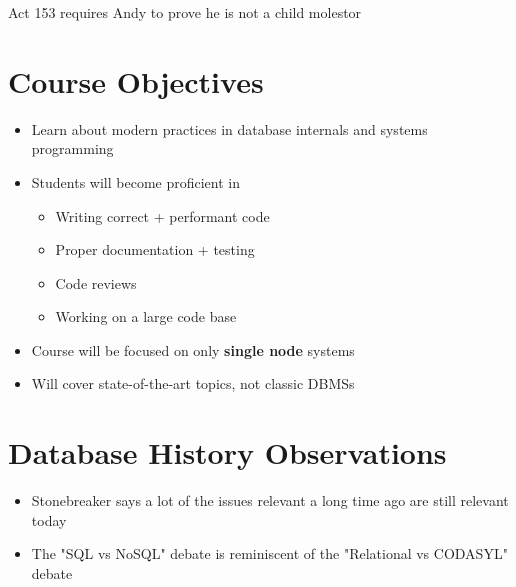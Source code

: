 \documentclass[11pt]{article}
\begin{document}
\maketitle
\thispagestyle{plain}

\begin{center}
    Act 153 requires Andy to prove he is not a child molestor
\end{center}

\section{Course Objectives}
\begin{itemize}
    \item Learn about modern practices in database internals and systems programming
    \item Students will become proficient in
    \begin{itemize}
        \item Writing correct + performant code
        \item Proper documentation + testing
        \item Code reviews
        \item Working on a large code base
    \end{itemize}
    \item Course will be focused on only \textbf{single node} systems
    \item Will cover state-of-the-art topics, not classic DBMSs
\end{itemize}

\section{Database History Observations}
\begin{itemize}
    \item Stonebreaker says a lot of the issues relevant a long time ago are still relevant today
    \item The "SQL vs NoSQL" debate is reminiscent of the "Relational vs CODASYL" debate
\end{itemize}
\end{document}
